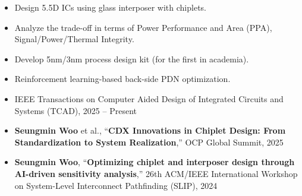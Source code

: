 \documentclass[10pt,letter,ragged2e]{altacv}
\begin{document}
\vspace{-5pt}
\divider
\vspace{-2.5pt}

\begin{itemize}
    \item Design 5.5D ICs using glass interposer with chiplets.
    \item Analyze the trade-off in terms of Power Performance and Area (PPA), Signal/Power/Thermal Integrity.
\end{itemize}

\vspace{-5pt}
\divider
\vspace{-5pt}

\begin{itemize}
    \item Develop 5nm/3nm process design kit (for the first in academia).
    \item Reinforcement learning-based back-side PDN optimization.
\end{itemize}

\vspace{5pt}

\begin{itemize}
    \item IEEE Transactions on Computer Aided Design of Integrated Circuits and Systems (TCAD), 2025 -- Present
    \end{itemize}
\begin{itemize}
    \item \textbf{Seungmin Woo} et al., “\textbf{CDX Innovations in Chiplet Design: From Standardization to System Realization},” OCP Global Summit, 2025
    \item \textbf{Seungmin Woo}, “\textbf{Optimizing chiplet and interposer design through AI-driven sensitivity analysis},” 26th ACM/IEEE International Workshop on System-Level Interconnect Pathfinding (SLIP), 2024
\end{itemize}


\end{document}
